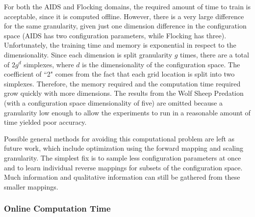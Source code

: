 For both the AIDS and Flocking domains, the required amount of time to train is acceptable, since it is computed offline.
However, there is a very large difference for the same granularity, given just one dimension difference in the configuration space (AIDS has two configuration parameters, while Flocking has three).
Unfortunately, the training time and memory is exponential in respect to the dimensionality.
Since each dimension is split granularity $g$ times, there are a total of $2 g^d$ simplexes, where $d$ is the dimensionality of the configuration space.
The coefficient of ``2" comes from the fact that each grid location is split into two simplexes.
Therefore, the memory required and the computation time required grow quickly with more dimensions.
The results from the Wolf Sheep Predation (with a configuration space dimensionality of five) are omitted because a granularity low enough to allow the experiments to run in a reasonable amount of time yielded poor accuracy.

Possible general methods for avoiding this computational problem are left as future work, which include optimization using the forward mapping and scaling granularity.
The simplest fix is to sample less configuration parameters at once and to learn individual reverse mappings for subsets of the configuration space.
Much information and qualitative information can still be gathered from these smaller mappings.


  \subsubsection{Online Computation Time}

